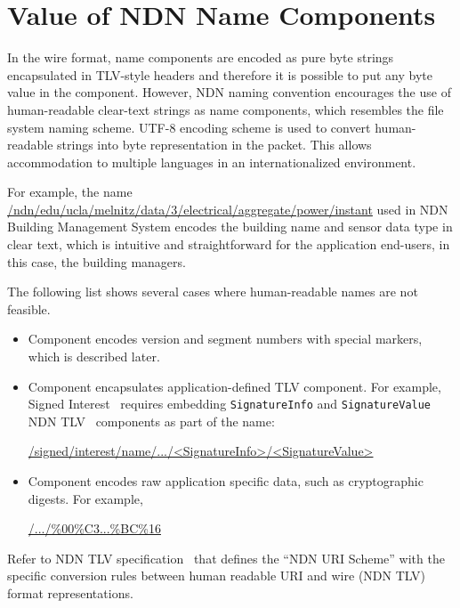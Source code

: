 \section{Value of NDN Name Components}

In the wire format, name components are encoded as pure byte strings encapsulated in TLV-style headers and therefore it is possible to put any byte value in the component.
However, NDN naming convention encourages the use of human-readable clear-text strings as name components, which resembles the file system naming scheme.
UTF-8 encoding scheme is used to convert human-readable strings into byte representation in the packet.
This allows accommodation to multiple languages in an internationalized environment.

For example, the name \url{/ndn/edu/ucla/melnitz/data/3/electrical/aggregate/power/instant} used in NDN Building Management System encodes the building name and sensor data type in clear text, which is intuitive and straightforward for the application end-users, in this case, the building managers.

The following list shows several cases where human-readable names are not feasible.

\begin{itemize}

\item Component encodes version and segment numbers with special markers, which is described later.

\item Component encapsulates application-defined TLV component.
For example, Signed Interest~\cite{signed-interest} requires embedding \verb|SignatureInfo| and \verb|SignatureValue| NDN TLV~\cite{ndn-tlv} components as part of the name:

  \begin{center}
    \url{/signed/interest/name/.../<SignatureInfo>/<SignatureValue>}
  \end{center}

\item Component encodes raw application specific data, such as cryptographic digests. For example,

  \begin{center}
    \url{/.../\%00\%C3...\%BC\%16}
  \end{center}

\end{itemize}

Refer to NDN TLV specification~\cite{ndn-tlv} that defines the ``NDN URI Scheme'' with the specific conversion rules between human readable URI and wire (NDN TLV) format representations.


